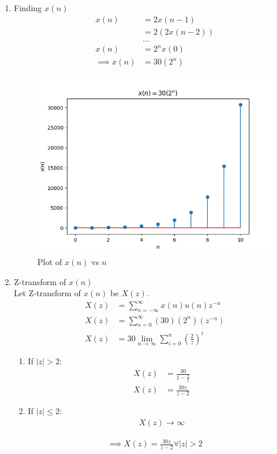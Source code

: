 \documentclass[journal,12pt,twocolumn]{IEEEtran}
\theoremstyle{remark}
\begin{document}
\begin{enumerate}
\item Finding $x(n)$
\begin{align}
x(n) &= 2x(n - 1) \\
&= 2(2x(n - 2)) \\
&\nonumber{\dots} \\
x(n) &= 2^nx(0) \\
\implies x(n) &= 30(2^n)
\end{align}

\begin{figure}[h!]
    \centering
    \includegraphics[width=\columnwidth]{figs/11_9_3_30.png}
    \caption{Plot of $x(n)$ vs $n$}
    \label{fig:1}
\end{figure}

\item Z-transform of $x(n)$ \\
Let Z-transform of $x(n)$ be $X(z)$.
\begin{align}
X(z) &= \sum_{n = -\infty}^{\infty} x(n)u(n)z^{-n} \\
X(z) &= \sum_{n = 0}^{\infty} (30)(2^n)(z^{-n}) \\
X(z) &= 30\lim_{n\to\infty}\sum_{i = 0}^{n}(\frac{2}{z})^i
\end{align}

\begin{enumerate}
\item If $|z| > 2$:
\begin{align}
X(z) &= \frac{30}{1 - \frac{2}{z}} \\
X(z) &= \frac{30z}{z - 2}
\end{align}

\item If $|z| \le 2$:
\begin{align}
X(z) \to \infty
\end{align}

\end{enumerate}

\begin{align}
\implies X(z) = \frac{30z}{z - 2} \forall |z| > 2
\end{align}

\end{enumerate}
\end{document}
